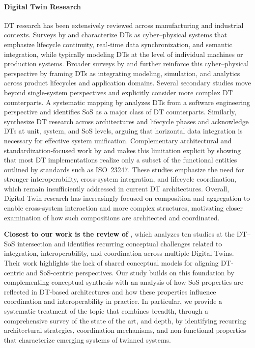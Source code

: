 \paragraph{Digital Twin Research}
DT research has been extensively reviewed across manufacturing and industrial contexts. Surveys by \citet{kritzinger2018digital} and \citet{negri2017review} characterize DTs as cyber--physical systems that emphasize lifecycle continuity, real-time data synchronization, and semantic integration, while typically modeling DTs at the level of individual machines or production systems. Broader surveys by \citet{tao2018digital} and \citet{fuller2020digital} further reinforce this cyber--physical perspective by framing DTs as integrating modeling, simulation, and analytics across product lifecycles and application domains.
Several secondary studies move beyond single-system perspectives and explicitly consider more complex DT counterparts. A systematic mapping by \citet{dalibor2022cross} analyzes DTs from a software engineering perspective and identifies SoS as a major class of DT counterparts. Similarly, \citet{semeraro2021digital} synthesize DT research across architectures and lifecycle phases and acknowledge DTs at unit, system, and SoS levels, arguing that horizontal data integration is necessary for effective system unification.
Complementary architectural and standardization-focused work by \citet{ferko2023standardisation} and \citet{ferko2022architecting} makes this limitation explicit by showing that most DT implementations realize only a subset of the functional entities outlined by standards such as ISO~23247. These studies emphasize the need for stronger interoperability, cross-system integration, and lifecycle coordination, which remain insufficiently addressed in current DT architectures.
Overall, Digital Twin research has increasingly focused on composition and aggregation to enable cross-system interaction and more complex structures, motivating closer examination of how such compositions are architected and coordinated.



\textbf{Closest to our work is the review of} \citet{olsson2023systems}, which analyzes ten studies at the DT--SoS intersection and identifies recurring conceptual challenges related to integration, interoperability, and coordination across multiple Digital Twins. Their work highlights the lack of shared conceptual models for aligning DT-centric and SoS-centric perspectives. Our study builds on this foundation by complementing conceptual synthesis with an analysis of how SoS properties are reflected in DT-based architectures and how these properties influence coordination and interoperability in practice. In particular, we provide a systematic treatment of the topic that combines breadth, through a comprehensive survey of the state of the art, and depth, by identifying recurring architectural strategies, coordination mechanisms, and non-functional properties that characterize emerging systems of twinned systems.

